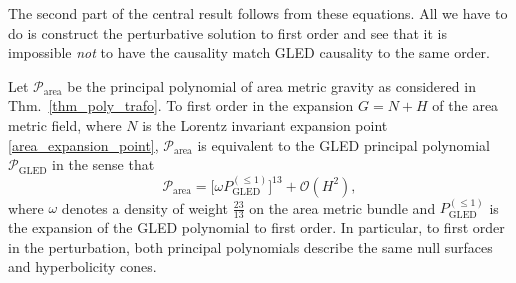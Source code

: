 The second part of the central result follows from these equations. All we have to do is construct the perturbative solution to first order and see that it is impossible \emph{not} to have the causality match GLED causality to the same order.

\begin{theorem}
  Let $\mathcal P_\text{area}$ be the principal polynomial of area metric gravity as considered in Thm.~\ref{thm_poly_trafo}. To first order in the expansion $G = N + H$ of the area metric field, where $N$ is the Lorentz invariant expansion point \eqref{area_expansion_point}, $\mathcal P_\text{area}$ is equivalent to the GLED principal polynomial $\mathcal P_\text{GLED}$ in the sense that
  \begin{equation}\label{eq_thm_poly}
    \mathcal P_\text{area} = \lbrack \omega P_\text{GLED}^{(\leq 1)}\rbrack^{13} + \mathcal O(H^2),
  \end{equation}
  where $\omega$ denotes a density of weight $\frac{23}{13}$ on the area metric bundle and $P_\text{GLED}^{(\leq 1)}$ is the expansion of the GLED polynomial to first order. In particular, to first order in the perturbation, both principal polynomials describe the same null surfaces and hyperbolicity cones.
\end{theorem}
